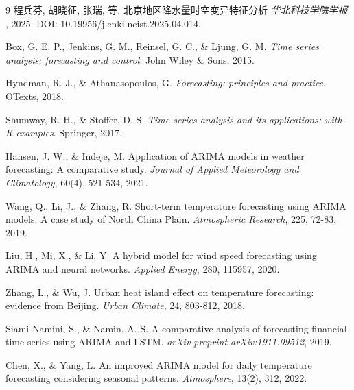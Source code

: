 \documentclass[withoutpreface,bwprint]{cumcmthesis} %
\begin{document}
\begin{thebibliography}{9}%
程兵芬, 胡晓征, 张瑞, 等.
\newblock 北京地区降水量时空变异特征分析
\newblock \emph{华北科技学院学报} , 2025.
\newblock DOI: 10.19956/j.cnki.ncist.2025.04.014.

Box, G. E. P., Jenkins, G. M., Reinsel, G. C., \& Ljung, G. M.
\newblock \emph{Time series analysis: forecasting and control}.
\newblock John Wiley \& Sons, 2015.

Hyndman, R. J., \& Athanasopoulos, G.
\newblock \emph{Forecasting: principles and practice}.
\newblock OTexts, 2018.

Shumway, R. H., \& Stoffer, D. S.
\newblock \emph{Time series analysis and its applications: with R examples}.
\newblock Springer, 2017.

Hansen, J. W., \& Indeje, M.
\newblock Application of ARIMA models in weather forecasting: A comparative study.
\newblock \emph{Journal of Applied Meteorology and Climatology}, 60(4), 521-534, 2021.

Wang, Q., Li, J., \& Zhang, R.
\newblock Short-term temperature forecasting using ARIMA models: A case study of North China Plain.
\newblock \emph{Atmospheric Research}, 225, 72-83, 2019.

Liu, H., Mi, X., \& Li, Y.
\newblock A hybrid model for wind speed forecasting using ARIMA and neural networks.
\newblock \emph{Applied Energy}, 280, 115957, 2020.

Zhang, L., \& Wu, J.
\newblock Urban heat island effect on temperature forecasting: evidence from Beijing.
\newblock \emph{Urban Climate}, 24, 803-812, 2018.

Siami-Namini, S., \& Namin, A. S.
\newblock A comparative analysis of forecasting financial time series using ARIMA and LSTM.
\newblock \emph{arXiv preprint arXiv:1911.09512}, 2019.

Chen, X., \& Yang, L.
\newblock An improved ARIMA model for daily temperature forecasting considering seasonal patterns.
\newblock \emph{Atmosphere}, 13(2), 312, 2022.
\newpage
\end{thebibliography}
\end{document}
